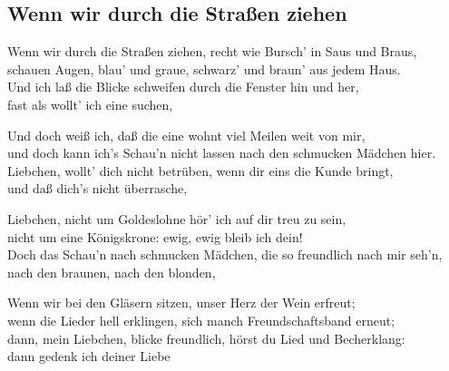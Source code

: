 
\subsection*{Wenn wir durch die Straßen ziehen}
%


\thestrophe Wenn wir durch die Straßen ziehen, recht wie Bursch' in Saus und Braus, \\
schauen Augen, blau' und graue, schwarz' und braun' aus jedem Haus. \\
Und ich laß die Blicke schweifen durch die Fenster hin und her, \\
fast als wollt' ich eine suchen, 

\thestrophe Und doch weiß ich, daß die eine wohnt viel Meilen weit von mir, \\
und doch kann ich's Schau'n nicht lassen nach den schmucken Mädchen hier. \\
Liebchen, wollt' dich nicht betrüben, wenn dir eins die Kunde bringt, \\
und daß dich's nicht überrasche, 

\thestrophe Liebchen, nicht um Goldeslohne hör' ich auf dir treu zu sein, \\
nicht um eine Königskrone: ewig, ewig bleib ich dein! \\
Doch das Schau'n nach schmucken Mädchen, die so freundlich nach mir seh'n, \\
nach den braunen, nach den blonden, 

\thestrophe Wenn wir bei den Gläsern sitzen, unser Herz der Wein erfreut; \\
wenn die Lieder hell erklingen, sich manch Freundschaftsband erneut; \\
dann, mein Liebchen, blicke freundlich, hörst du Lied und Becherklang: \\
dann gedenk ich deiner Liebe 